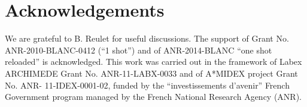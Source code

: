 \documentclass[twocolumn,showpacs,preprintnumbers,amsmath,amssymb%
 aps,
 prb,
 lengthcheck,%
]{revtex4-1}
\begin{document}
\section*{Acknowledgements}
We are grateful to B. Reulet for useful discussions. The support of Grant No. ANR-2010-BLANC-0412 (``1 shot'') and of ANR-2014-BLANC ``one shot reloaded'' is acknowledged. This work was carried out
in the framework of Labex ARCHIMEDE Grant No. ANR-11-LABX-0033 and of A*MIDEX project Grant No. ANR-
11-IDEX-0001-02, funded by the ``investissements d'avenir'' French Government program managed by the French National
Research Agency (ANR).

{} 
\end{document}

